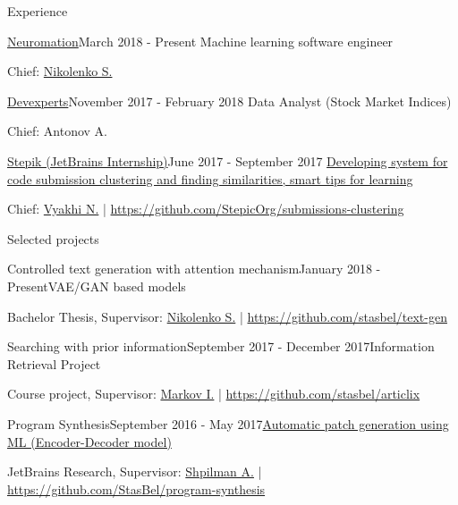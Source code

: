 \documentclass{resume} %
\begin{document}
\begin{rSection}{Experience}

\begin{rSubsection}{\href{http://stepik.org/}{Neuromation}}{March 2018 - Present}
{Machine learning software engineer}{} 
\item[] Chief: \href{https://logic.pdmi.ras.ru/~sergey/}{Nikolenko S.}
\end{rSubsection}

\begin{rSubsection}{\href{http://stepik.org/}{Devexperts}}{November 2017 - February 2018}
{Data Analyst (Stock Market Indices)}{} 
\item[] Chief: Antonov A.
\end{rSubsection}

\begin{rSubsection}{\href{http://stepik.org/}{Stepik (JetBrains Internship)}}{June 2017 - September 2017}
{\href{https://jetbrains.ru/students/internship/themes/again/}{Developing system for code submission clustering and finding similarities, smart tips for learning}}{} 
\item[] Chief: \href{http://bioinformaticsinstitute.ru/teachers/vyahhi}{Vyakhi N.} | \url{https://github.com/StepicOrg/submissions-clustering}
\end{rSubsection}

\end{rSection} 
\vspace{-1.2\baselineskip}
\begin{rSection}{Selected projects}

\begin{rSubsection}{Controlled text generation with attention mechanism}{January 2018 - Present}{VAE/GAN based models}{}
\item[] Bachelor Thesis, Supervisor: \href{https://logic.pdmi.ras.ru/~sergey/}{Nikolenko S.} | \url{https://github.com/stasbel/text-gen}
\end{rSubsection}

\begin{rSubsection}{Searching with prior information}{September 2017 - December 2017}{Information Retrieval Project}{}
\item[] Course project, Supervisor: \href{https://staff.fnwi.uva.nl/i.markov/}{Markov I.} | \url{https://github.com/stasbel/articlix}
\end{rSubsection}

\begin{rSubsection}{Program Synthesis}{September 2016 - May 2017}{\href{https://docs.google.com/presentation/d/113EFcW8L7p8ickhfMoht8ivOomq2fRPizLtWSH9cSX4/pub?start=false&loop=false&delayms=3000}{Automatic patch generation using ML (Encoder-Decoder model)}}{}
\item[] JetBrains Research, Supervisor: \href{https://research.jetbrains.org/ru/researchers/ashpilman}{Shpilman A.} | \url{https://github.com/StasBel/program-synthesis}
\end{rSubsection}

\end{rSection}
\end{document}
